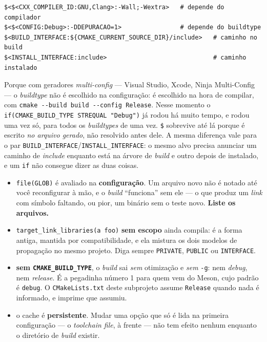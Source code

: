 \begin{lstlisting}[style=bt, language=Meson,
    caption={As quatro formas que resolvem quase tudo. Fonte:
             \texttt{src/cmake/README.md}, demo 1.}]
$<$<CXX_COMPILER_ID:GNU,Clang>:-Wall;-Wextra>   # depende do compilador
$<$<CONFIG:Debug>:-DDEPURACAO=1>                # depende do buildtype
$<BUILD_INTERFACE:${CMAKE_CURRENT_SOURCE_DIR}/include>   # caminho no build
$<INSTALL_INTERFACE:include>                             # caminho instalado
\end{lstlisting}

\begin{porque}
Porque com geradores \emph{multi-config} --- Visual Studio, Xcode, Ninja
Multi-Config --- o \emph{buildtype} não é escolhido na configuração: é escolhido
na hora de compilar, com \texttt{cmake -{}-build build -{}-config Release}.
Nesse momento o \texttt{if(CMAKE\_BUILD\_TYPE STREQUAL "Debug")} já rodou há
muito tempo, e rodou uma vez só, para todos os \emph{buildtypes} de uma vez.
\texttt{\$<CONFIG:Debug>} sobrevive até lá porque é escrito \emph{no arquivo
gerado}, não resolvido antes dele. A mesma diferença vale para o par
\texttt{BUILD\_INTERFACE}/\texttt{INSTALL\_INTERFACE}: o mesmo alvo precisa
anunciar um caminho de \emph{include} enquanto está na árvore de \emph{build} e
outro depois de instalado, e um \texttt{if} não consegue dizer as duas coisas.
\end{porque}

\begin{armadilha}
\begin{itemize}
    \item \texttt{file(GLOB)} é avaliado na \textbf{configuração}. Um arquivo
          novo não é notado até você reconfigurar à mão, e o \emph{build}
          ``funciona'' sem ele --- o que produz um \emph{link} com símbolo
          faltando, ou pior, um binário sem o teste novo.
          \textbf{Liste os arquivos.}
    \item \texttt{target\_link\_libraries(a foo)} \textbf{sem escopo} ainda
          compila: é a forma antiga, mantida por compatibilidade, e ela mistura
          os dois modelos de propagação no mesmo projeto. Diga sempre
          \texttt{PRIVATE}, \texttt{PUBLIC} ou \texttt{INTERFACE}.
    \item \textbf{sem \texttt{CMAKE\_BUILD\_TYPE}}, o \emph{build} sai
          \emph{sem} otimização e \emph{sem} \texttt{-g}: nem \emph{debug}, nem
          \emph{release}. É a pegadinha número 1 para quem vem do Meson, cujo
          padrão é \texttt{debug}. O \texttt{CMakeLists.txt} deste subprojeto
          assume \texttt{Release} quando nada é informado, e imprime que assumiu.
    \item o cache é \textbf{persistente}. Mudar uma opção que só é lida na
          primeira configuração --- o \emph{toolchain file}, à frente --- não
          tem efeito nenhum enquanto o diretório de \emph{build} existir.
\end{itemize}
\end{armadilha}

